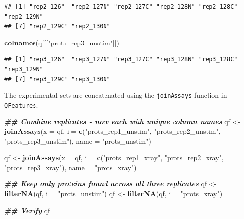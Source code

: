 \documentclass[9pt,a4paper,]{extarticle}
\newenvironment{Shaded}{\begin{snugshade}}{\end{snugshade}}
\newcommand{\AttributeTok}[1]{\textcolor[rgb]{0.13,0.29,0.53}{#1}}
\newcommand{\DocumentationTok}[1]{\textcolor[rgb]{0.56,0.35,0.01}{\textbf{\textit{#1}}}}
\newcommand{\FunctionTok}[1]{\textcolor[rgb]{0.13,0.29,0.53}{\textbf{#1}}}
\newcommand{\NormalTok}[1]{#1}
\newcommand{\OtherTok}[1]{\textcolor[rgb]{0.56,0.35,0.01}{#1}}
\newcommand{\StringTok}[1]{\textcolor[rgb]{0.31,0.60,0.02}{#1}}
\begin{document}
\begin{verbatim}
## [1] "rep2_126"  "rep2_127N" "rep2_127C" "rep2_128N" "rep2_128C" "rep2_129N"
## [7] "rep2_129C" "rep2_130N"
\end{verbatim}

\begin{Shaded}
\begin{Highlighting}[]
\FunctionTok{colnames}\NormalTok{(qf[[}\StringTok{"prots\_rep3\_unstim"}\NormalTok{]])}
\end{Highlighting}
\end{Shaded}

\begin{verbatim}
## [1] "rep3_126"  "rep3_127N" "rep3_127C" "rep3_128N" "rep3_128C" "rep3_129N"
## [7] "rep3_129C" "rep3_130N"
\end{verbatim}

The experimental sets are concatenated using the \texttt{joinAssays} function in \texttt{QFeatures}.

\begin{Shaded}
\begin{Highlighting}[]
\DocumentationTok{\#\# Combine replicates {-} now each with unique column names}
\NormalTok{qf }\OtherTok{\textless{}{-}} \FunctionTok{joinAssays}\NormalTok{(}\AttributeTok{x =}\NormalTok{ qf, }
                 \AttributeTok{i =} \FunctionTok{c}\NormalTok{(}\StringTok{"prots\_rep1\_unstim"}\NormalTok{, }
                       \StringTok{"prots\_rep2\_unstim"}\NormalTok{, }
                       \StringTok{"prots\_rep3\_unstim"}\NormalTok{),}
                  \AttributeTok{name =} \StringTok{"prots\_unstim"}\NormalTok{)}

\NormalTok{qf }\OtherTok{\textless{}{-}} \FunctionTok{joinAssays}\NormalTok{(}\AttributeTok{x =}\NormalTok{ qf, }
                 \AttributeTok{i =} \FunctionTok{c}\NormalTok{(}\StringTok{"prots\_rep1\_xray"}\NormalTok{, }
                       \StringTok{"prots\_rep2\_xray"}\NormalTok{, }
                       \StringTok{"prots\_rep3\_xray"}\NormalTok{),}
                 \AttributeTok{name =} \StringTok{"prots\_xray"}\NormalTok{)}

\DocumentationTok{\#\# Keep only proteins found across all three replicates}
\NormalTok{qf }\OtherTok{\textless{}{-}} \FunctionTok{filterNA}\NormalTok{(qf, }\AttributeTok{i =} \StringTok{"prots\_unstim"}\NormalTok{)}
\NormalTok{qf }\OtherTok{\textless{}{-}} \FunctionTok{filterNA}\NormalTok{(qf, }\AttributeTok{i =} \StringTok{"prots\_xray"}\NormalTok{)}

\DocumentationTok{\#\# Verify}
\NormalTok{qf}
\end{Highlighting}
\end{Shaded}
\end{document}
